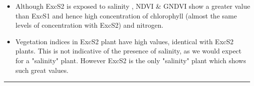 \documentclass{article}
\begin{document}
{\begin{landscape}
                    \begin{itemize}
                       \item Although ExcS2 is exposed to salinity , NDVI & GNDVI show a greater value than ExcS1 and hence high concentration of chlorophyll (almost the same levels of concentration with ExcS2) and nitrogen.
                       \item Vegetation indices in ExcS2 plant have high values, identical with ExcS2 plants. This is not indicative of the presence of salinity, as we would expect for a "salinity" plant. However ExcS2 is the only "salinity" plant which shows such great values.
                    \end{itemize}
                    \newpage
                    \vspace*{-3.8\baselineskip}
                    \hrule
                    \vspace*{3\baselineskip}
                    

\end{landscape}}
\end{document}

